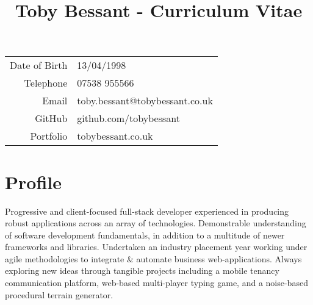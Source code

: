 \documentclass[11pt]{article}
\title{\bfseries\Huge Toby Bessant - Curriculum Vitae\vspace{-2em}}
\date{}
\begin{document}
\sloppy
\maketitle
\thispagestyle{fancy}
\begin{center}
\begin{tabular}[]{rl}
Date of Birth & 13/04/1998\\
Telephone     &07538 955566\\
Email            & toby.bessant@tobybessant.co.uk\\
GitHub 	    & github.com/tobybessant\\
Portfolio        & tobybessant.co.uk\\
\end{tabular}
\end{center}
\vspace*{-19pt}
\section*{Profile}
\vspace*{-10pt}
Progressive and client-focused full-stack developer experienced in producing robust applications across an array of technologies. Demonstrable understanding of software development fundamentals, in addition to a multitude of newer frameworks and libraries. Undertaken an industry placement year working under agile methodologies to integrate \& automate business web-applications. Always exploring new ideas through tangible projects including a mobile tenancy communication platform, web-based multi-player typing game, and a noise-based procedural terrain generator.
 \vspace*{-10pt}
\end{document}
